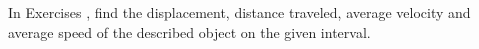 {\noindent In Exercises}
{ , find the displacement, distance traveled, average velocity and average speed of the described object on the given interval.
}
